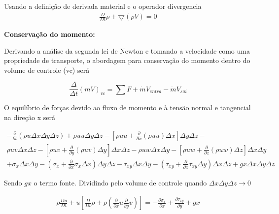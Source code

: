 \documentclass[]{article}
\begin{document}
Usando a definição de derivada material e o operador divergencia
\begin{equation}
	\begin{aligned}
		\frac{D}{D t} \rho +  \bigtriangledown (\rho V)= 0 
	\end{aligned}
\end{equation}


\textbf{Conservação do momento:} 

Derivando a análise da segunda lei de Newton e tomando a velocidade como uma propriedade de transporte, o abordagem para conservação do momento dentro do volume de controle (vc) será

\begin{equation}
	\frac{\Delta }{\Delta t} (mV)_{vc}= \sum F +\dot{m}V_{entra} - \dot{m}V_{sai}
\end{equation}




O equilíbrio de forças devido ao fluxo de momento e à tensão normal e tangencial na direção x será

\begin{equation}
	\begin{aligned}
		-\frac{\partial}{\partial t} (\rho u \Delta x \Delta y \Delta z) + \rho uu \Delta y \Delta z - [\rho uu +	\frac{\partial}{\partial x}(\rho uu)\Delta x]\Delta y\Delta z - \\  \rho uv \Delta x \Delta z - [\rho uv +	\frac{\partial}{\partial y}(\rho uv)\Delta y]\Delta x\Delta z -   \rho uw \Delta x \Delta y - [\rho uw +	\frac{\partial}{\partial z}(\rho uw)\Delta z]\Delta x\Delta y \\ + \sigma_{x} \Delta x\Delta y - (\sigma_{x} + \frac{\partial}{\partial x}\sigma_{x} \Delta x) \Delta y\Delta z - \tau_{xy} \Delta x\Delta y - (\tau_{xy} + \frac{\partial}{\partial x}\tau_{xy} \Delta y) \Delta x\Delta z + gx \Delta x\Delta y\Delta z
	\end{aligned}
\end{equation}

Sendo $gx$ o termo fonte. Dividindo pelo volume de controle quando $\Delta x \Delta y  \Delta z \rightarrow 0 $

\begin{equation}
	\begin{aligned}
		\rho \frac{ Du}{Dt} + u[ \frac{D}{D t} \rho + \rho(\frac{\partial}{\partial x}u \frac{\partial}{\partial y}v)] = - \frac{\partial \sigma_{x}}{\partial x} +  \frac{\partial \tau_{xy}}{\partial y} + gx   
	\end{aligned}
\end{equation}
\end{document}
